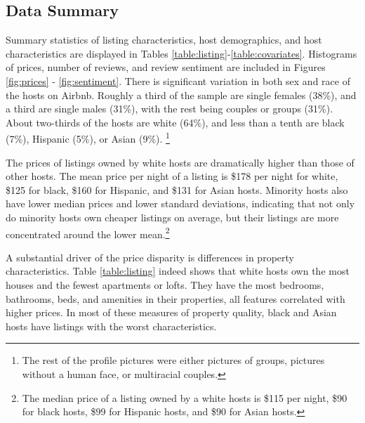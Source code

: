 \subsection{Data Summary}
\label{summary}
Summary statistics of listing characteristics, host demographics, and host characteristics are displayed in Tables \ref{table:listing}-\ref{table:covariates}. Histograms of prices, number of reviews, and review sentiment are included in Figures \ref{fig:prices} - \ref{fig:sentiment}. There is significant variation in both sex and race of the hosts on Airbnb. Roughly a third of the sample are single females (38\%), and a third are single males (31\%), with the rest being couples or groups (31\%). About two-thirds of the hosts are white (64\%), and less than a tenth are black (7\%), Hispanic (5\%), or Asian (9\%).%
\footnote{The rest of the profile pictures were either pictures of groups, pictures without a human face, or multiracial couples.} 

The prices of listings owned by white hosts are dramatically higher than those of other hosts. The mean price per night of a listing is \$178 per night for white, \$125 for black, \$160 for Hispanic, and \$131 for Asian hosts. Minority hosts also have lower median prices and lower standard deviations, indicating that not only do minority hosts own cheaper listings on average, but their listings are more concentrated around the lower mean.\footnote{The median price of a listing owned by a white hosts is \$115 per night, \$90 for black hosts, \$99 for Hispanic hosts, and \$90 for Asian hosts.} 

A substantial driver of the price disparity is differences in property characteristics. Table \ref{table:listing} indeed shows that white hosts own the most houses and the fewest apartments or lofts. They have the most bedrooms, bathrooms, beds, and amenities in their properties, all features correlated with higher prices. In most of these measures of property quality, black and Asian hosts have listings with the worst characteristics. 


